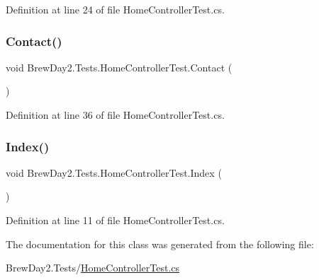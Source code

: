Definition at line 24 of file Home\+Controller\+Test.\+cs.

\mbox{\label{class_brew_day2_1_1_tests_1_1_home_controller_test_a83be45e471f422fbed1c51d8f5328567}} 
\subsubsection{\texorpdfstring{Contact()}{Contact()}}
{\footnotesize\ttfamily void Brew\+Day2.\+Tests.\+Home\+Controller\+Test.\+Contact (\begin{DoxyParamCaption}{ }\end{DoxyParamCaption})}



Definition at line 36 of file Home\+Controller\+Test.\+cs.

\mbox{\label{class_brew_day2_1_1_tests_1_1_home_controller_test_af1900233c3a196c192c2c56776891fc3}} 
\subsubsection{\texorpdfstring{Index()}{Index()}}
{\footnotesize\ttfamily void Brew\+Day2.\+Tests.\+Home\+Controller\+Test.\+Index (\begin{DoxyParamCaption}{ }\end{DoxyParamCaption})}



Definition at line 11 of file Home\+Controller\+Test.\+cs.



The documentation for this class was generated from the following file\+:\begin{DoxyCompactItemize}
\item 
Brew\+Day2.\+Tests/\mbox{\hyperlink{_home_controller_test_8cs}{Home\+Controller\+Test.\+cs}}\end{DoxyCompactItemize}
